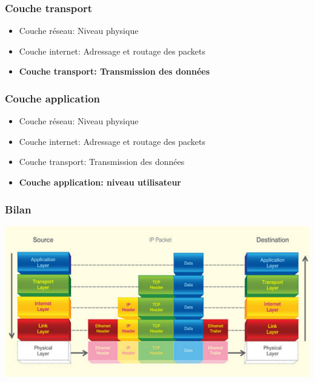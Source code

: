 \begin{frame}\frametitle{Couche transport} %

    \begin{itemize}
        \item {\Large Couche réseau}: Niveau physique
        \item {\Large Couche internet}: Adressage et routage des packets
        \item \textbf{{\Large Couche transport}: Transmission des données}
    \end{itemize}


\end{frame}


\begin{frame}\frametitle{Couche application}

    \begin{itemize}
        \item {\Large Couche réseau}: Niveau physique
        \item {\Large Couche internet}: Adressage et routage des packets
        \item {\Large Couche transport}: Transmission des données
        \item \textbf{{\Large Couche application}: niveau utilisateur}
    \end{itemize}

\end{frame}


\begin{frame}\frametitle{Bilan}

    \includegraphics[scale=0.75]{res/DodExplain.pdf}

\end{frame}

